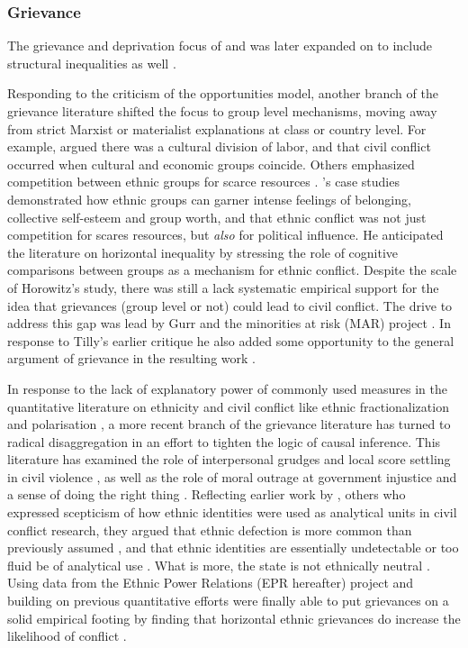 \subsubsection{Grievance} \label{Grievance}

The grievance and deprivation focus of \citet{GurrTedRobert1970Wmr} and
\citet{Davies_1962} was later expanded on to include structural inequalities as
well \citep{Muller_1985, Muller_1987, ScottJamesC1977TMEo}. 

Responding to the criticism of the opportunities model, another branch of the
grievance literature shifted the focus to group level mechanisms,
moving away from strict Marxist or materialist explanations at class or country
level. For example, \citet{Hechter_1978} argued there was a cultural division of
labor, and that civil conflict occurred when cultural and economic groups
coincide. Others emphasized competition between ethnic groups for scarce
resources \citep{barth1969}. \citet{Horowitz1985}'s case studies demonstrated
how ethnic groups can garner intense feelings of belonging, collective
self-esteem and group worth, and that ethnic conflict was not just competition
for scares resources, but \textit{also} for political influence. He anticipated
the literature on horizontal inequality by stressing the role of cognitive
comparisons between groups as a mechanism for ethnic conflict. Despite the scale
of Horowitz's study, there was still a lack systematic empirical support for the
idea that grievances (group level or not) could lead to civil conflict. The
drive to address this gap was lead by Gurr and the minorities at risk (MAR)
project \citet{GurrTedRobert1993Mar:}. In response to Tilly's earlier
critique he also added some opportunity to the general argument of grievance in
the resulting work \citep{Gurr_1993}. 

In response to the lack of explanatory power of commonly used measures in the
quantitative literature on ethnicity and civil conflict like ethnic
fractionalization \citep{Alesina2003, Posner2004} and polarisation
\citep{Montalvo2005}, a more recent branch of the grievance literature has
turned to radical disaggregation in an effort to tighten the logic of causal
inference. This literature has examined  the role of interpersonal grudges and
local score settling in civil violence \citep{Kalyvas2006, Kalyvas_2008}, as
well as the role of moral outrage at government injustice and a sense of doing
the right thing \citep{Wood2003}. Reflecting earlier work by \citet{barth1969},
others who expressed scepticism of how ethnic identities were used as analytical
units in civil conflict research, they argued that ethnic defection is more
common than previously assumed \citep{Kalyvas_2008, Staniland_2012}, and that
ethnic identities are essentially undetectable or too fluid be of analytical use
\citep{Gilley_2004, Chandra2006}. What is more, the state is not ethnically
neutral \citep{CedermanLars-Erik2013Igac}. Using data from the Ethnic Power
Relations (EPR hereafter) project \citet{CedermanLars-Erik2013Igac} and building
on previous quantitative efforts \citep{Gurr_1993, Goldstone_2010} were finally
able to put grievances on a solid empirical footing by finding that horizontal
ethnic grievances do increase the likelihood of conflict
\citep{CedermanLars-Erik2013Igac}. 

